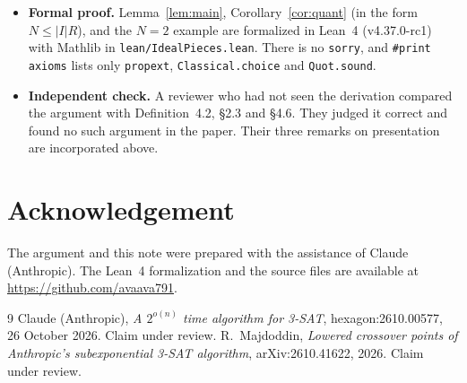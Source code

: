 \documentclass[11pt]{article}
\theoremstyle{remark}
\begin{document}
\begin{itemize}
\item \textbf{Formal proof.} Lemma~\ref{lem:main}, Corollary~\ref{cor:quant} (in the form $N\le|I|R$), and the $N=2$ example are formalized in Lean~4 (v4.37.0-rc1) with Mathlib in \texttt{lean/IdealPieces.lean}. There is no \texttt{sorry}, and \texttt{\#print axioms} lists only \texttt{propext}, \texttt{Classical.choice} and \texttt{Quot.sound}.
\item \textbf{Independent check.} A reviewer who had not seen the derivation compared the argument with Definition~4.2, \S2.3 and \S4.6. They judged it correct and found no such argument in the paper. Their three remarks on presentation are incorporated above.
\end{itemize}

\section*{Acknowledgement}
The argument and this note were prepared with the assistance of Claude (Anthropic). The Lean~4 formalization and the source files are available at \url{https://github.com/avaava791}.

\begin{thebibliography}{9}
 Claude (Anthropic), \emph{A $2^{o(n)}$ time algorithm for 3-SAT}, hexagon:2610.00577, 26 October 2026. Claim under review.
 R.~Majdoddin, \emph{Lowered crossover points of Anthropic's subexponential 3-SAT algorithm}, arXiv:2610.41622, 2026. Claim under review.
\end{thebibliography}
\end{document}
